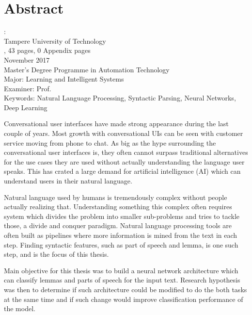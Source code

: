 \documentclass[12pt,a4paper,english
]{tutthesis}
\begin{document}
\chapter*{Abstract}

\begin{spacing}{1.0}
         {\bf \textsf{\MakeUppercase{\@author}}}: \@title\\   %
         \textsf{Tampere University of Technology}\\
         \textsf{\@thesistype, 43 pages, 0 Appendix pages} \\
         \textsf{November 2017}\\
         \textsf{Master's Degree Programme in Automation Technology}\\
         \textsf{Major: Learning and Intelligent Systems}\\
         \textsf{Examiner: Prof. \@examiner}\\ %
         \textsf{Keywords: Natural Language Processing, Syntactic Parsing, Neural Networks, Deep Learning}\\
\end{spacing}

Conversational user interfaces have made strong appearance during the last couple of years. Most growth with conversational UIs can be seen with customer service moving from phone to chat. As big as the hype surrounding the conversational user interfaces is, they often cannot surpass traditional alternatives for the use cases they are used without actually understanding the language user speaks. This has crated a large demand for artificial intelligence (AI) which can understand users in their natural language.

Natural language used by humans is tremendously complex without people actually realizing that. Understanding something this complex often requires system which divides the problem into smaller sub-problems and tries to tackle those, a divide and conquer paradigm. Natural language processing tools are often built as pipelines where more information is mined from the text in each step. Finding syntactic features, such as part of speech and lemma,  is one such step, and is the focus of this thesis.

Main objective for this thesis was to build a neural network architecture which can classify lemmas and parts of speech for the input text. Research hypothesis was then to determine if such architecture could be modified to do the both tasks at the same time and if such change would improve classification performance of the model.
\end{document}
